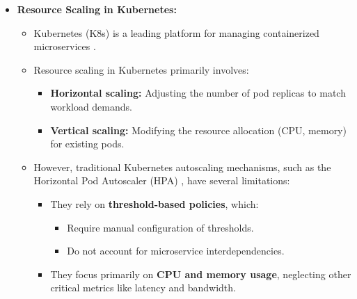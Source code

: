 \documentclass[conference]{IEEEtran}
\begin{document}
\begin{itemize}
    \item \textbf{Resource Scaling in Kubernetes:}
    \begin{itemize}
        \item Kubernetes (K8s) is a leading platform for managing containerized microservices \cite{burns2019kubernetes}.
        \item Resource scaling in Kubernetes primarily involves:
        \begin{itemize}
            \item \textbf{Horizontal scaling:} Adjusting the number of pod replicas to match workload demands.
            \item \textbf{Vertical scaling:} Modifying the resource allocation (CPU, memory) for existing pods.
        \end{itemize}
        \item However, traditional Kubernetes autoscaling mechanisms, such as the Horizontal Pod Autoscaler (HPA) \cite{kubernetesHPA}, have several limitations:
        \begin{itemize}
            \item They rely on \textbf{threshold-based policies}, which:
            \begin{itemize}
                \item Require manual configuration of thresholds.
                \item Do not account for microservice interdependencies.
            \end{itemize}
            \item They focus primarily on \textbf{CPU and memory usage}, neglecting other critical metrics like latency and bandwidth.
        \end{itemize}
    \end{itemize}


\end{itemize}
\end{document}
